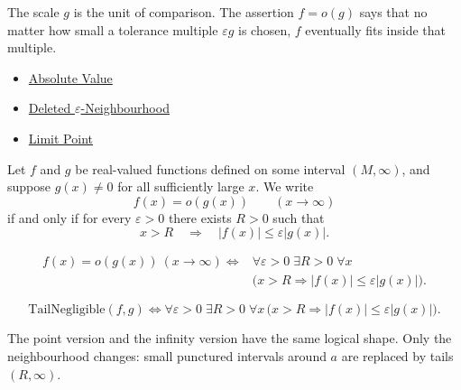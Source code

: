 \begin{remark*}[Interpretation]
The scale $g$ is the unit of comparison. The assertion $f=o(g)$ says that no
matter how small a tolerance multiple $\varepsilon g$ is chosen, $f$ eventually
fits inside that multiple.
\end{remark*}

\begin{dependencies}
\begin{itemize}
  \item \hyperref[def:absolute-value]{Absolute Value}
  \item \hyperref[def:deleted-epsilon-neighbourhood]{Deleted \(\varepsilon\)-Neighbourhood}
  \item \hyperref[def:limit-point]{Limit Point}
\end{itemize}
\end{dependencies}

\begin{definition}
\label{def:little-o-at-infinity}
Let $f$ and $g$ be real-valued functions defined on some interval
$(M,\infty)$, and suppose $g(x)\neq 0$ for all sufficiently large $x$. We write
\[
  f(x)=o(g(x))\qquad (x\to\infty)
\]
if and only if for every $\varepsilon>0$ there exists $R>0$ such that
\[
  x>R
  \quad\Longrightarrow\quad
  |f(x)|\leq \varepsilon |g(x)|.
\]
\end{definition}

\begin{remark*}
\[
\begin{aligned}
f(x)=o(g(x))\ (x\to\infty)
\Longleftrightarrow
&\forall\varepsilon>0\;\exists R>0\;\forall x\\
&\bigl(x>R\Rightarrow |f(x)|\leq \varepsilon |g(x)|\bigr).
\end{aligned}
\]
\end{remark*}

\begin{remark*}
\[
\text{TailNegligible}(f,g)
\Longleftrightarrow
\forall\varepsilon>0\;\exists R>0\;\forall x\,
\bigl(x>R\Rightarrow |f(x)|\leq \varepsilon |g(x)|\bigr).
\]
\end{remark*}

\begin{remark*}[Interpretation]
The point version and the infinity version have the same logical shape. Only
the neighbourhood changes: small punctured intervals around $a$ are replaced
by tails $(R,\infty)$.
\end{remark*}


